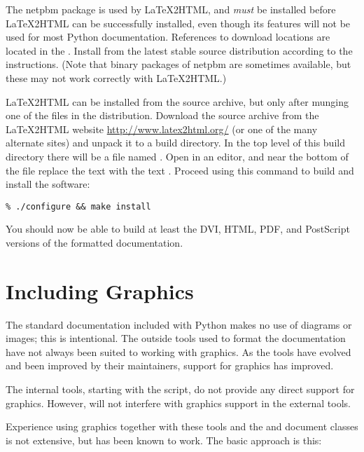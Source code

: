 \documentclass{howto}
\begin{document}
    The netpbm package is used by \LaTeX2HTML, and \emph{must} be
    installed before \LaTeX2HTML can be successfully installed, even
    though its features will not be used for most Python
    documentation.  References to download locations are located in
    the .
    Install from the latest stable source distribution according to
    the instructions.  (Note that binary packages of netpbm are
    sometimes available, but these may not work correctly with
    \LaTeX2HTML.)

    \LaTeX2HTML can be installed from the source archive, but only
    after munging one of the files in the distribution.  Download the
    source archive from the \LaTeX2HTML website
    \url{http://www.latex2html.org/} (or one of the many alternate
    sites) and unpack it to a build directory. In the top level of
    this build directory there will be a file named .
    Open  in an editor, and near the bottom of the file
    replace the text  with the text
    .  Proceed using this command to build and install
    the software:

\begin{verbatim}
% ./configure && make install
\end{verbatim}

    You should now be able to build at least the DVI, HTML, PDF, and
    PostScript versions of the formatted documentation.


\section{Including Graphics \label{graphics}}

  The standard documentation included with Python makes no use of
  diagrams or images; this is intentional.  The outside tools used to
  format the documentation have not always been suited to working with
  graphics.  As the tools have evolved and been improved by their
  maintainers, support for graphics has improved.

  The internal tools, starting with the  script, do
  not provide any direct support for graphics.  However,
   will not interfere with graphics support in the
  external tools.

  Experience using graphics together with these tools and the
   and  document classes is not extensive,
  but has been known to work.  The basic approach is this:
\end{document}
